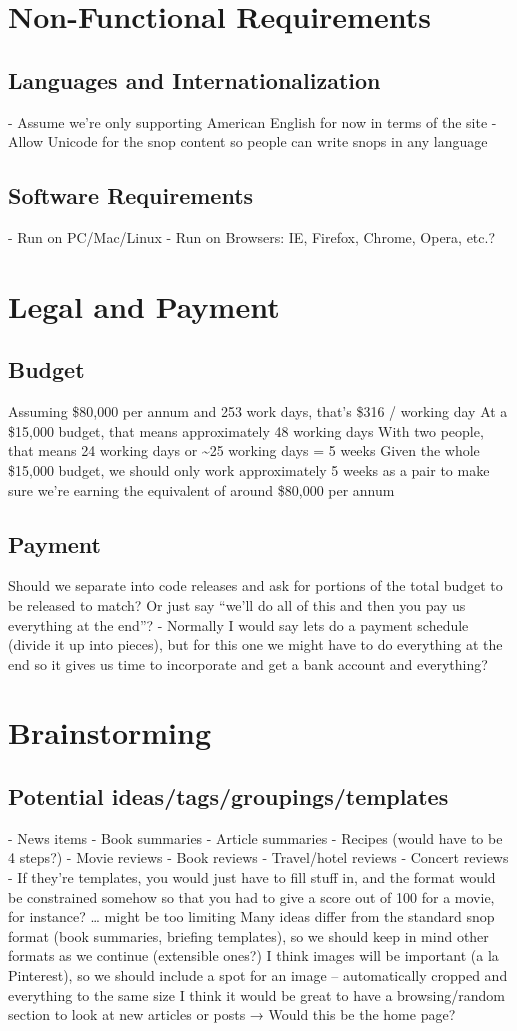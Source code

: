 \documentclass[11pt]{article}
\begin{document}
\section{Non-Functional Requirements}
\subsection{Languages and Internationalization}
- Assume we’re only supporting American English for now in terms of the site
- Allow Unicode for the snop content so people can write snops in any language
\subsection{Software Requirements}
- Run on PC/Mac/Linux
- Run on Browsers: IE, Firefox, Chrome, Opera, etc.?
\section{Legal and Payment}
\subsection{Budget}
Assuming \$80,000 per annum and 253 work days, that’s \$316 / working day
At a \$15,000 budget, that means approximately 48 working days
With two people, that means 24 working days or \~{}25 working days = 5 weeks
Given the whole \$15,000 budget, we should only work approximately 5 weeks as a pair to make sure we’re earning the equivalent of around \$80,000 per annum
\subsection{Payment}
Should we separate into code releases and ask for portions of the total budget to be released to match? Or just say “we’ll do all of this and then you pay us everything at the end”?
- Normally I would say lets do a payment schedule (divide it up into pieces), but for this one we might have to do everything at the end so it gives us time to incorporate and get a bank account and everything?
\section{Brainstorming}
\subsection{Potential ideas/tags/groupings/templates}
- News items
- Book summaries
- Article summaries
- Recipes (would have to be 4 steps?)
- Movie reviews
- Book reviews
- Travel/hotel reviews
- Concert reviews
- If they’re templates, you would just have to fill stuff in, and the format would be constrained somehow so that you had to give a score out of 100 for a movie, for instance? … might be too limiting
Many ideas differ from the standard snop format (book summaries, briefing templates), so we should keep in mind other formats as we continue (extensible ones?)
I think images will be important (a la Pinterest), so we should include a spot for an image -- automatically cropped and everything to the same size
I think it would be great to have a browsing/random section to look at new articles or posts → Would this be the home page?
\end{document}
